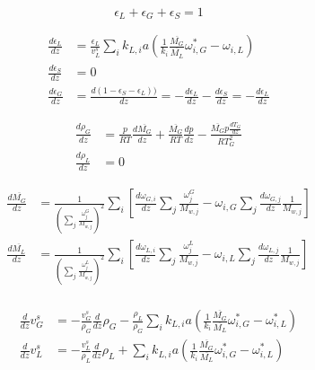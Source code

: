 \documentclass{article}
\begin{document}
\begin{equation}
	\epsilon_L + \epsilon_G + \epsilon_S = 1
\end{equation}

\begin{equation}
	\begin{split}
	\frac{d \epsilon_L}{dz} &= \frac{\epsilon_L}{v_L^s}\sum_ik_{L,i}a(\frac{1}{k_i}\frac{\overline{M_G}}{\overline{M_L}}\omega_{i,G}^*-\omega_{i,L}) \\
	\frac{d \epsilon_S}{dz} &= 0\\
	\frac{d \epsilon_G}{dz} &= \frac{d (1 - \epsilon_S - \epsilon_L))}{dz} = -\frac{d \epsilon_L}{dz} - \frac{d \epsilon_S}{dz} = -\frac{d \epsilon_L}{dz}
	\end{split}
\end{equation}

\begin{equation}
	\begin{split}
		\frac{d \rho_G}{dz} &= \frac{p}{RT}\frac{d\overline{M_G}}{dz} + \frac{\overline{M_G}}{RT}\frac{dp}{dz} - \frac{\overline{M_G}p \frac{dT_G}{dz}}{R T_G^2} \\
		\frac{d \rho_L}{dz} &= 0
	\end{split}
\end{equation}

\begin{equation}
	\begin{split}
		\frac{d \overline{M_G}}{dz} &= \frac{1}{\left(\sum_j \frac{\omega_j^G}{M_{w,j}}\right)^2}\sum_i\left[\frac{d\omega_{G,i}}{dz} \sum_j\frac{\omega_j^G}{M_{w,j}} - \omega_{i,G}\sum_j \frac{d\omega_{G,j}}{dz}\frac{1}{M_{w,j}} \right] \\
		\frac{d \overline{M_L}}{dz} &= \frac{1}{\left(\sum_j \frac{\omega_j^L}{M_{w,j}}\right)^2}\sum_i\left[\frac{d\omega_{L,i}}{dz} \sum_j\frac{\omega_j^L}{M_{w,j}} - \omega_{i,L}\sum_j \frac{d\omega_{L,j}}{dz}\frac{1}{M_{w,j}} \right] \\
	\end{split}
\end{equation}

\begin{equation}
	\begin{split}
		\frac{d}{dz}v_G^s &= -\frac{v_G^s}{\rho_G}\frac{d}{dz}\rho_G - \frac{\rho_L}{\rho_G}\sum_ik_{L,i}a(\frac{1}{k_i}\frac{\overline{M_G}}{\overline{M_L}}\omega_{i,G}^*-\omega_{i,L}^*)\\
		\frac{d}{dz}v_L^s &= -\frac{v_L^s}{\rho_L}\frac{d}{dz}\rho_L + \sum_ik_{L,i}a(\frac{1}{k_i}\frac{\overline{M_G}}{\overline{M_L}}\omega_{i,G}^*-\omega_{i,L}^*)
	\end{split}
\end{equation}
\end{document}
